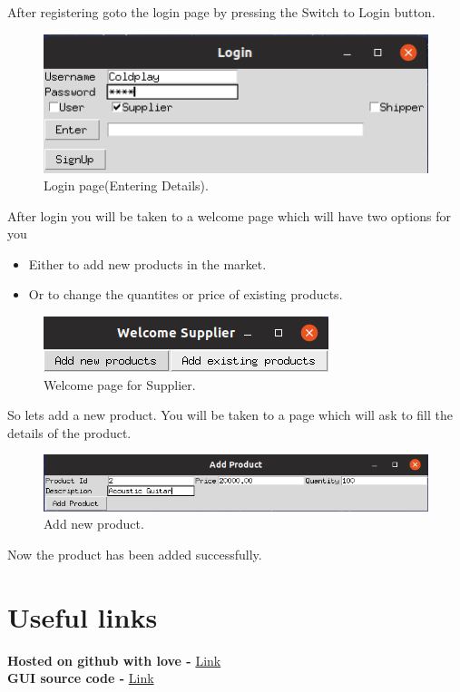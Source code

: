 \documentclass[a4paper,12pt]{article} %
\begin{document}
After registering goto the login page by pressing the Switch to Login button.
\begin{figure}[H]
    \centering
    \includegraphics[scale=0.5]{login2.png} 
    \caption{Login page(Entering Details).}
\end{figure}
After login you will be taken to a welcome page which will have two options for you 
\begin{itemize}
    \item Either to add new products in the market.
    \item Or to change the quantites or price of existing products. 
\end{itemize}
\begin{figure}[H]
    \centering
    \includegraphics[scale=0.5]{supp1.png} 
    \caption{Welcome page for Supplier.}
\end{figure}
So lets add a new product. You will be taken to a page which will ask to fill the details of the product.
\begin{figure}[H]
    \centering
    \includegraphics[scale=0.5]{supp2.png} 
    \caption{Add new product.}
\end{figure}
Now the product has been added successfully.

\newpage
\section{Useful links}
\begin{center}
\textbf{Hosted on github with love - } \href{https://github.com/nikhilyadv/DBMS-Lab-Project}{Link}\\
\textbf{GUI source code - } \href{https://github.com/nikhilyadv/DBMS-Lab-Project/tree/master/GUI}{Link}
\end{center}
\newpage
\end{document}
